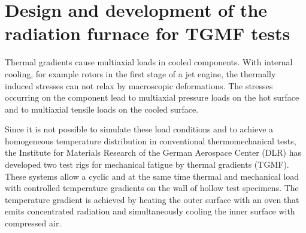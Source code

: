 %

\section{Design and development of the radiation furnace for TGMF tests}



Thermal gradients cause multiaxial loads in cooled components. With internal cooling, for example rotors in the first stage of a jet engine, the thermally induced stresses can not relax by macroscopic deformations. The stresses occurring on the component lead to multiaxial pressure loads on the hot surface and to multiaxial tensile loads on the cooled surface.

Since it is not possible to simulate these load conditions and to achieve a homogeneous temperature distribution in conventional thermomechanical tests, the Institute for Materials Research of the German Aerospace Center (DLR) has developed two test rigs for mechanical fatigue by thermal gradients (TGMF). These systems allow a cyclic and at the same time thermal and mechanical load with controlled temperature gradients on the wall of hollow test specimens. The temperature gradient is achieved by heating the outer surface with an oven that emits concentrated radiation and simultaneously cooling the inner surface with compressed air.


